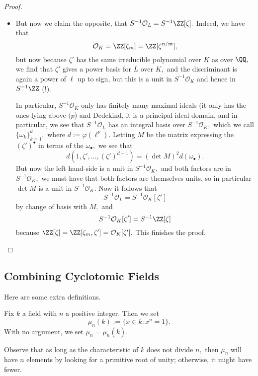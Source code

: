 \begin{proof}
\begin{itemize}
		\item But now we claim the opposite, that $S^{-1}\mathcal O_L=S^{-1}\ZZ[\zeta].$ Indeed, we have that
		\[\mathcal O_K=\ZZ[\zeta_m]=\ZZ[\zeta^{n/m}],\]
		but now because $\zeta'$ has the same irreducible polynomial over $K$ as over $\QQ,$ we find that $\zeta'$ gives a power basis for $L$ over $K,$ and the discriminant is again a power of $\ell$ up to sign, but this is a unit in $S^{-1}\mathcal O_K$ and hence in $S^{-1}\ZZ$ (!).
		
		In particular, $S^{-1}\mathcal O_K$ only has finitely many maximal ideals (it only has the ones lying above $(p$) and Dedekind, it is a principal ideal domain, and in particular, we see that $S^{-1}\mathcal O_L$ has an integral basis over $S^{-1}\mathcal O_K,$ which we call $\{\omega_k\}_{k=1}^d,$ where $d:=\varphi\left(\ell^\nu\right).$ Letting $M$ be the matrix expressing the $(\zeta')^\bullet$ in terms of the $\omega_\bullet,$ we see that
		\[d(1,\zeta',\ldots,(\zeta')^{d-1})=(\det M)^2d(\omega_\bullet).\]
		But now the left hand-side is a unit in $S^{-1}\mathcal O_K,$ and both factors are in $S^{-1}\mathcal O_K,$ we must have that both factors are themselves units, so in particular $\det M$ is a unit in $S^{-1}\mathcal O_K.$ Now it follows that
		\[S^{-1}\mathcal O_L=S^{-1}\mathcal O_K[\zeta']\]
		by change of basis with $M,$ and
		\[S^{-1}\mathcal O_K[\zeta']=S^{-1}\ZZ[\zeta]\]
		because $\ZZ[\zeta]=\ZZ[\zeta_m,\zeta']=\mathcal O_K[\zeta'].$ This finishes the proof.
		\qedhere
	\end{itemize}
\end{proof}

\subsection{Combining Cyclotomic Fields}
Here are some extra definitions.
\begin{definition}
	Fix $k$ a field with $n$ a positive integer. Then we set
	\[\mu_n(k):=\{x\in k:x^n=1\}.\]
	With no argument, we set $\mu_n=\mu_n(\overline k).$
\end{definition}
Observe that as long as the characteristic of $k$ does not divide $n,$ then $\mu_n$ will have $n$ elements by looking for a primitive root of unity; otherwise, it might have fewer.

